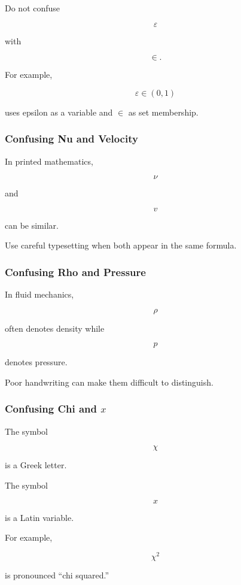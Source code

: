 Do not confuse

\[
\varepsilon
\]

with

\[
\in.
\]

For example,

\[
\boxed{
\varepsilon\in(0,1)
}
\]

uses epsilon as a variable and \(\in\) as set membership.

\subsubsection{Confusing Nu and Velocity}

In printed mathematics,

\[
\nu
\]

and

\[
v
\]

can be similar.

Use careful typesetting when both appear in the same formula.

\subsubsection{Confusing Rho and Pressure}

In fluid mechanics,

\[
\rho
\]

often denotes density while

\[
p
\]

denotes pressure.

Poor handwriting can make them difficult to distinguish.

\subsubsection{Confusing Chi and \(x\)}

The symbol

\[
\chi
\]

is a Greek letter.

The symbol

\[
x
\]

is a Latin variable.

For example,

\[
\chi^2
\]

is pronounced ``chi squared.''

